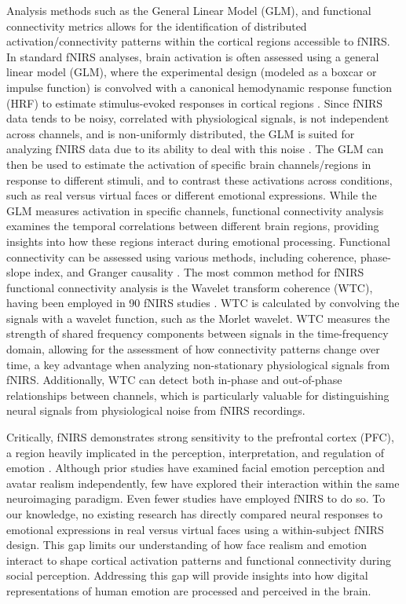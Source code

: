 Analysis methods such as the General Linear Model (GLM), and functional connectivity metrics allows for the identification of distributed activation/connectivity patterns within the cortical regions accessible to fNIRS.
In standard fNIRS analyses, brain activation is often assessed using a general linear model (GLM), where the experimental design (modeled as a boxcar or impulse function) is convolved with a canonical hemodynamic response function (HRF) to estimate stimulus-evoked responses in cortical regions \citep{tak_statistical_2014}.
Since fNIRS data tends to be noisy, correlated with physiological signals, is not independent across channels, and is non-uniformly distributed, the GLM is suited for analyzing fNIRS data due to its ability to deal with this noise \citep{huppert_commentary_2016}. 
The GLM can then be used to estimate the activation of specific brain channels/regions in response to different stimuli, and to contrast these activations across conditions, such as real versus virtual faces or different emotional expressions.
While the GLM measures activation in specific channels, functional connectivity analysis examines the temporal correlations between different brain regions, providing insights into how these regions interact during emotional processing.
Functional connectivity can be assessed using various methods, including coherence, phase-slope index, and Granger causality \citep{bastos_tutorial_2016}.
The most common method for fNIRS functional connectivity analysis is the Wavelet transform coherence (WTC), having been employed in 90 fNIRS studies \citep{hakim_quantification_2023}. 
WTC is calculated by convolving the signals with a wavelet function, such as the Morlet wavelet. 
WTC measures the strength of shared frequency components between signals in the time-frequency domain, allowing for the assessment of how connectivity patterns change over time, a key advantage when analyzing non-stationary physiological signals from fNIRS. 
Additionally, WTC can detect both in-phase and out-of-phase relationships between channels, which is particularly valuable for distinguishing neural signals from physiological noise from fNIRS recordings.

Critically, fNIRS demonstrates strong sensitivity to the prefrontal cortex (PFC), a region heavily implicated in the perception, interpretation, and regulation of emotion \citep{westgarth_systematic_2021, bendall_brief_2016}.
Although prior studies have examined facial emotion perception and avatar realism independently, few have explored their interaction within the same neuroimaging paradigm. 
Even fewer studies have employed fNIRS to do so. 
To our knowledge, no existing research has directly compared neural responses to emotional expressions in real versus virtual faces using a within-subject fNIRS design. 
This gap limits our understanding of how face realism and emotion interact to shape cortical activation patterns and functional connectivity during social perception. 
Addressing this gap will provide insights into how digital representations of human emotion are processed and perceived in the brain.

